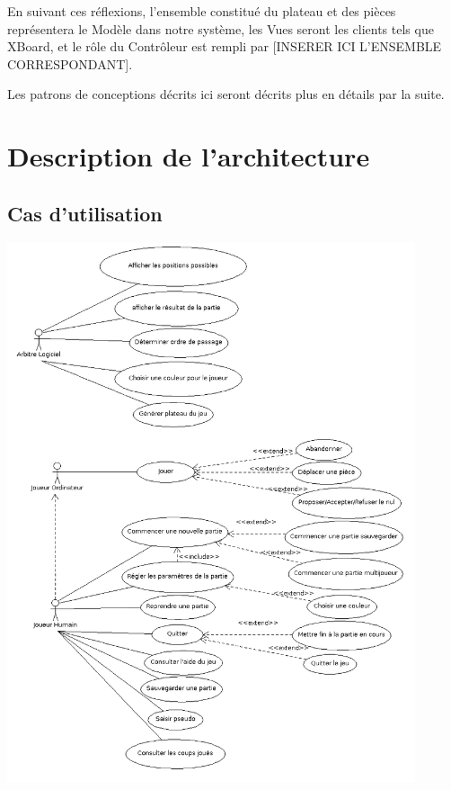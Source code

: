 \documentclass[11pt]{article}
\begin{document}
En suivant ces réflexions, l'ensemble constitué du plateau et des pièces représentera le Modèle dans notre système, les Vues seront les clients tels que XBoard, et le rôle du Contrôleur est rempli par [INSERER ICI L'ENSEMBLE CORRESPONDANT].

Les patrons de conceptions décrits ici seront décrits plus en détails par la suite.
\newpage
\section{Description de l’architecture}
\label{sec-3}
\subsection{Cas d'utilisation}
\label{sec-3-1}
\includegraphics[width=0.9\textwidth]{Diagrammedecasdutilisation.png}
\end{document}

